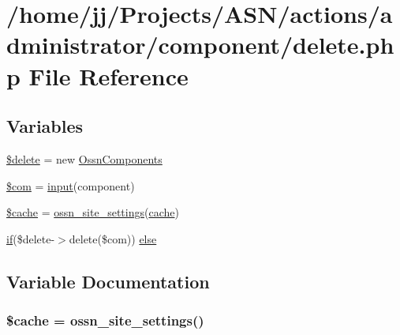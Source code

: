 \hypertarget{actions_2administrator_2component_2delete_8php}{}\section{/home/jj/\+Projects/\+A\+S\+N/actions/administrator/component/delete.php File Reference}
\label{actions_2administrator_2component_2delete_8php}
\subsection*{Variables}
\begin{DoxyCompactItemize}
\item 
\hyperlink{actions_2administrator_2component_2delete_8php_aba2374a8b713514611e21494ec2fef8d}{\$delete} = new \hyperlink{class_ossn_components}{Ossn\+Components}
\item 
\hyperlink{actions_2administrator_2component_2delete_8php_aeb238dc1f5c0181fea3117fd9ba0429f}{\$com} = \hyperlink{ossn_8lib_8input_8php_a64ebee98b041c4f75f71ed3cd73cc8ed}{input}(\textquotesingle{}component\textquotesingle{})
\item 
\hyperlink{actions_2administrator_2component_2delete_8php_ac2dc76d756ec398393d4b1d23659276c}{\$cache} = \hyperlink{ossn_8lib_8system_8php_a610e2045b8a86c09f777b4d82e24e34c}{ossn\+\_\+site\+\_\+settings}(\textquotesingle{}\hyperlink{jquery_8tokeninput_8js_a521016aa0ca9ff38bfba60ab069cb34b}{cache}\textquotesingle{})
\item 
\hyperlink{jquery_8tokeninput_8js_ad8dd46a3cbc004569e34401e9e71771a}{if}(\$delete-\/$>$delete(\$com)) \hyperlink{actions_2administrator_2component_2delete_8php_a9925185ffaf0178fca2695865d573cbf}{else}
\end{DoxyCompactItemize}


\subsection{Variable Documentation}
\subsubsection[{\texorpdfstring{\$cache}{$cache}}]{\setlength{\rightskip}{0pt plus 5cm}\${\bf cache} = {\bf ossn\+\_\+site\+\_\+settings}(\textquotesingle{})}\hypertarget{actions_2administrator_2component_2delete_8php_ac2dc76d756ec398393d4b1d23659276c}{}\label{actions_2administrator_2component_2delete_8php_ac2dc76d756ec398393d4b1d23659276c}


